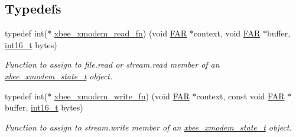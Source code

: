 \subsection*{Typedefs}
\begin{DoxyCompactItemize}
\item 
typedef int($\ast$ \hyperlink{group__util__xmodem_ga25f49dbd4c2f9e274a32217a709d6382}{xbee\+\_\+xmodem\+\_\+read\+\_\+fn}) (void \hyperlink{group__hal_gaef060b3456fdcc093a7210a762d5f2ed}{F\+AR} $\ast$context, void \hyperlink{group__hal_gaef060b3456fdcc093a7210a762d5f2ed}{F\+AR} $\ast$buffer, \hyperlink{group__hal__dos_ga2140805d08462d474b82ddc8d1c2f3e6}{int16\+\_\+t} bytes)
\begin{DoxyCompactList}\small\item\em Function to assign to {\ttfamily file.\+read} or {\ttfamily stream.\+read} member of an \hyperlink{structxbee__xmodem__state__t}{xbee\+\_\+xmodem\+\_\+state\+\_\+t} object. \end{DoxyCompactList}\item 
typedef int($\ast$ \hyperlink{group__util__xmodem_ga57f329cc7f4e1b18f5baddb888221d7f}{xbee\+\_\+xmodem\+\_\+write\+\_\+fn}) (void \hyperlink{group__hal_gaef060b3456fdcc093a7210a762d5f2ed}{F\+AR} $\ast$context, const void \hyperlink{group__hal_gaef060b3456fdcc093a7210a762d5f2ed}{F\+AR} $\ast$buffer, \hyperlink{group__hal__dos_ga2140805d08462d474b82ddc8d1c2f3e6}{int16\+\_\+t} bytes)
\begin{DoxyCompactList}\small\item\em Function to assign to {\ttfamily stream.\+write} member of an \hyperlink{structxbee__xmodem__state__t}{xbee\+\_\+xmodem\+\_\+state\+\_\+t} object. \end{DoxyCompactList}\end{DoxyCompactItemize}
